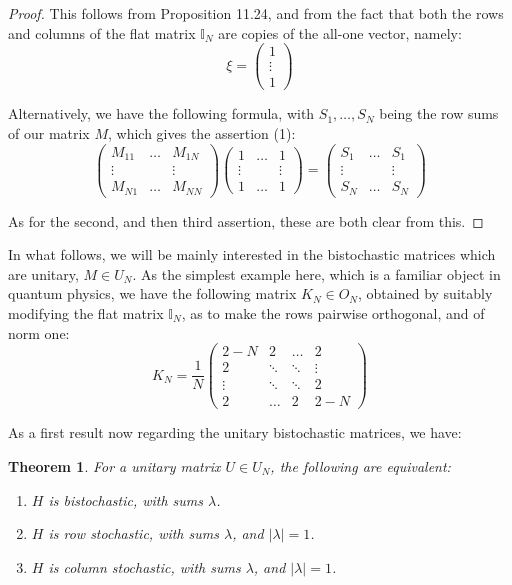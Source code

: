 \documentclass[12pt]{amsbook}
\newtheorem{theorem}{Theorem}[chapter]
\begin{document}
\begin{proof}
This follows from Proposition 11.24, and from the fact that both the rows and columns of the flat matrix $\mathbb I_N$ are copies of the all-one vector, namely:
$$\xi=\begin{pmatrix}
1\\
\vdots\\
1
\end{pmatrix}$$

Alternatively, we have the following formula, with $S_1,\ldots,S_N$ being the row sums of our matrix $M$, which gives the assertion (1):
$$\begin{pmatrix}
M_{11}&\ldots&M_{1N}\\
\vdots&&\vdots\\
M_{N1}&\ldots&M_{NN}
\end{pmatrix}
\begin{pmatrix}
1&\ldots&1\\
\vdots&&\vdots\\
1&\ldots&1
\end{pmatrix}
=\begin{pmatrix}
S_1&\ldots&S_1\\
\vdots&&\vdots\\
S_N&\ldots&S_N
\end{pmatrix}$$

As for the second, and then third assertion, these are both clear from this.
\end{proof}

In what follows, we will be mainly interested in the bistochastic matrices which are unitary, $M\in U_N$. As the simplest example here, which is a familiar object in quantum physics, we have the following matrix $K_N\in O_N$, obtained by suitably modifying the flat matrix $\mathbb I_N$, as to make the rows pairwise orthogonal, and of norm one:
$$K_N=\frac{1}{N}\begin{pmatrix}
2-N&2&\ldots&2\\
2&\ddots&\ddots&\vdots\\
\vdots&\ddots&\ddots&2\\
2&\ldots&2&2-N
\end{pmatrix}$$

As a first result now regarding the unitary bistochastic matrices, we have:

\begin{theorem}
For a unitary matrix $U\in U_N$, the following are equivalent:
\begin{enumerate}
\item $H$ is bistochastic, with sums $\lambda$.

\item $H$ is row stochastic, with sums $\lambda$, and $|\lambda|=1$.

\item $H$ is column stochastic, with sums $\lambda$, and $|\lambda|=1$.
\end{enumerate}
\end{theorem}
\end{document}
